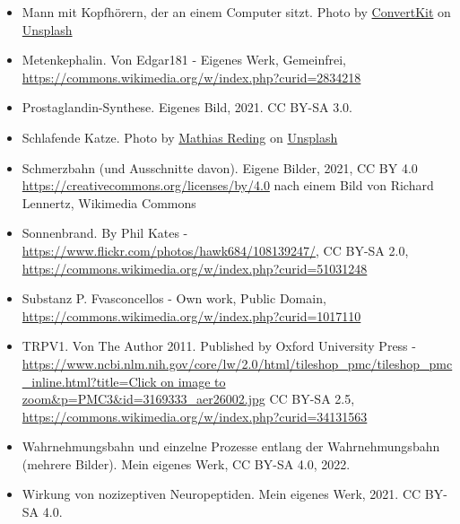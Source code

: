 \documentclass{beamer}
\begin{document}
\begin{frame}
\begin{tiny}
\begin{itemize}
\item 
Mann mit Kopfhörern, der an einem Computer sitzt. Photo by \href{https://unsplash.com/@convertkit?utm_content=creditCopyText&utm_medium=referral&utm_source=unsplash}{  ConvertKit} on \href{https://unsplash.com/photos/BOI9jki3nzY?utm_content=creditCopyText&utm_medium=referral&utm_source=unsplash}{Unsplash}
  

\item
Metenkephalin. Von Edgar181 - Eigenes Werk, Gemeinfrei, \url{https://commons.wikimedia.org/w/index.php?curid=2834218}

\item
Prostaglandin-Synthese. Eigenes Bild, 2021. CC BY-SA 3.0.

\item
Schlafende Katze. Photo by \href{https://unsplash.com/@matreding?utm_source=unsplash&utm_medium=referral&utm_content=creditCopyText}{Mathias Reding} on \href{https://unsplash.com/s/photos/sleep?utm_source=unsplash&utm_medium=referral&utm_content=creditCopyText}{Unsplash}
  

\item
Schmerzbahn (und Ausschnitte davon). Eigene Bilder, 2021, CC BY 4.0 \url{https://creativecommons.org/licenses/by/4.0} nach einem Bild von Richard Lennertz,  Wikimedia Commons

\item
Sonnenbrand. By Phil Kates - \url{https://www.flickr.com/photos/hawk684/108139247/}, CC BY-SA 2.0, \url{https://commons.wikimedia.org/w/index.php?curid=51031248}

\item
Substanz P. Fvasconcellos - Own work, Public Domain, \url{https://commons.wikimedia.org/w/index.php?curid=1017110}

\item
TRPV1. Von The Author 2011. Published by Oxford University Press - \url{https://www.ncbi.nlm.nih.gov/core/lw/2.0/html/tileshop_pmc/tileshop_pmc_inline.html?title=Click on image to zoom&p=PMC3&id=3169333_aer26002.jpg}
CC BY-SA 2.5, \url{https://commons.wikimedia.org/w/index.php?curid=34131563}

\item
Wahrnehmungsbahn und einzelne Prozesse entlang der Wahrnehmungsbahn (mehrere Bilder). Mein eigenes Werk, CC BY-SA 4.0, 2022. 

\item
Wirkung von nozizeptiven Neuropeptiden. Mein eigenes Werk, 2021. CC BY-SA 4.0. 

\end{itemize}
\end{tiny}

\end{frame}
\end{document}
